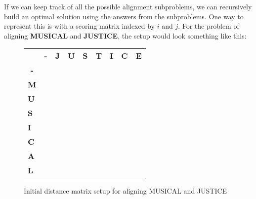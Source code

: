 If we can keep track of all the possible alignment subproblems, we can recursively build an optimal solution using the answers from the subproblems. One way to represent this is with a scoring matrix indexed by $i$ and $j$. For the problem of aligning \textbf{MUSICAL} and \textbf{JUSTICE}, the setup would look something like this:


\begin{figure}[!h]
\centering
\begin{tabular}{lllllllll}
                                & \multicolumn{1}{c}{\textbf{-}} & \textbf{J}            & \textbf{U}            & \textbf{S}            & \textbf{T}            & \textbf{I}            & \textbf{C}            & \textbf{E}            \\ \cline{2-9} 
\multicolumn{1}{c|}{\textbf{-}} & \multicolumn{1}{l|}{}          & \multicolumn{1}{l|}{} & \multicolumn{1}{l|}{} & \multicolumn{1}{l|}{} & \multicolumn{1}{l|}{} & \multicolumn{1}{l|}{} & \multicolumn{1}{l|}{} & \multicolumn{1}{l|}{} \\ \cline{2-9} 
\multicolumn{1}{l|}{\textbf{M}} & \multicolumn{1}{l|}{}          & \multicolumn{1}{l|}{} & \multicolumn{1}{l|}{} & \multicolumn{1}{l|}{} & \multicolumn{1}{l|}{} & \multicolumn{1}{l|}{} & \multicolumn{1}{l|}{} & \multicolumn{1}{l|}{} \\ \cline{2-9} 
\multicolumn{1}{l|}{\textbf{U}} & \multicolumn{1}{l|}{}          & \multicolumn{1}{l|}{} & \multicolumn{1}{l|}{} & \multicolumn{1}{l|}{} & \multicolumn{1}{l|}{} & \multicolumn{1}{l|}{} & \multicolumn{1}{l|}{} & \multicolumn{1}{l|}{} \\ \cline{2-9} 
\multicolumn{1}{l|}{\textbf{S}} & \multicolumn{1}{l|}{}          & \multicolumn{1}{l|}{} & \multicolumn{1}{l|}{} & \multicolumn{1}{l|}{} & \multicolumn{1}{l|}{} & \multicolumn{1}{l|}{} & \multicolumn{1}{l|}{} & \multicolumn{1}{l|}{} \\ \cline{2-9} 
\multicolumn{1}{l|}{\textbf{I}} & \multicolumn{1}{l|}{}          & \multicolumn{1}{l|}{} & \multicolumn{1}{l|}{} & \multicolumn{1}{l|}{} & \multicolumn{1}{l|}{} & \multicolumn{1}{l|}{} & \multicolumn{1}{l|}{} & \multicolumn{1}{l|}{} \\ \cline{2-9} 
\multicolumn{1}{l|}{\textbf{C}} & \multicolumn{1}{l|}{}          & \multicolumn{1}{l|}{} & \multicolumn{1}{l|}{} & \multicolumn{1}{l|}{} & \multicolumn{1}{l|}{} & \multicolumn{1}{l|}{} & \multicolumn{1}{l|}{} & \multicolumn{1}{l|}{} \\ \cline{2-9} 
\multicolumn{1}{l|}{\textbf{A}} & \multicolumn{1}{l|}{}          & \multicolumn{1}{l|}{} & \multicolumn{1}{l|}{} & \multicolumn{1}{l|}{} & \multicolumn{1}{l|}{} & \multicolumn{1}{l|}{} & \multicolumn{1}{l|}{} & \multicolumn{1}{l|}{} \\ \cline{2-9} 
\multicolumn{1}{l|}{\textbf{L}}   & \multicolumn{1}{l|}{}          & \multicolumn{1}{l|}{} & \multicolumn{1}{l|}{} & \multicolumn{1}{l|}{} & \multicolumn{1}{l|}{} & \multicolumn{1}{l|}{} & \multicolumn{1}{l|}{} & \multicolumn{1}{l|}{} \\ \cline{2-9} 
\end{tabular}
\caption{Initial distance matrix setup for aligning MUSICAL and JUSTICE}
\label{alignsetup}
\end{figure}

